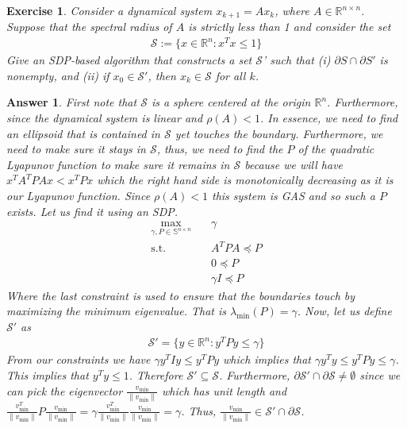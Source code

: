 \documentclass[12pt]{article}
\theoremstyle{colon}
\newtheorem{exercise}{Exercise}
\newtheorem*{answer}{Answer}
\begin{document}
\clearpage

\begin{exercise}
  Consider a dynamical system $x_{k+1} = A x_k$, where $A \in \mathbb{R}^{n \times n}$. Suppose that the spectral radius of $A$ is strictly less than 1 and consider the set
  \begin{gather*}
    \mathcal{S} := \{ x \in \mathbb{R}^n : x^T x \leq 1 \}
  \end{gather*}
  Give an SDP-based algorithm that constructs a set $\mathcal{S}$' such that (i) $\partial S \cap \partial S'$ is nonempty, and (ii) if $x_0 \in \mathcal{S}'$, then $x_k \in \mathcal{S}$ for all $k$.
\end{exercise}

\begin{answer}
  First note that $\mathcal{S}$ is a sphere centered at the origin $\mathbb{R}^n$. Furthermore, since the dynamical system is linear and $\rho(A) < 1$. In essence, we need to find an ellipsoid that is contained in $\mathcal{S}$ yet touches the boundary. Furthermore, we need to make sure it stays in $\mathcal{S}$, thus, we need to find the $P$ of the quadratic Lyapunov function to make sure it remains in $\mathcal{S}$ because we will have $x^T A^T P A x < x^T P x$ which the right hand side is monotonically decreasing as it is our Lyapunov function. Since $\rho(A) < 1$ this system is GAS and so such a $P$ exists. Let us find it using an SDP.
  \begin{align*}
    \max_{\gamma, P \in \mathbb{S}^{n \times n}} \quad &\gamma \\
    \text{s.t. } \quad & A^T P A \preceq P \\
    & 0 \preceq P \\
    & \gamma I \preceq P
  \end{align*}
  Where the last constraint is used to ensure that the boundaries touch by maximizing the minimum eigenvalue. That is $\lambda_{\min}(P) = \gamma$. Now, let us define $\mathcal{S}'$ as
  \begin{gather*}
    \mathcal{S}' = \{ y \in \mathbb{R}^n : y^T P y \leq  \gamma \}
  \end{gather*}
  From our constraints we have $\gamma y^T I y \leq y^T P y$ which implies that $\gamma y^T y \leq y^T P y \leq \gamma$. This implies that $y^T y \leq 1$. Therefore $\mathcal{S}' \subseteq \mathcal{S}$. Furthermore, $\partial \mathcal{S}' \cap \partial \mathcal{S} \neq \emptyset$ since we can pick the eigenvector $\frac{v_{\min}}{\lVert v_{\min} \rVert}$ which has unit length and $\frac{v_{\min}^T}{\lVert v_{\min} \rVert} P \frac{v_{\min}}{\lVert v_{\min} \rVert} = \gamma \frac{v_{\min}^T}{\lVert v_{\min} \rVert} \frac{v_{\min}}{\lVert v_{\min} \rVert} = \gamma$. Thus, $\frac{v_{\min}}{\lVert v_{\min} \rVert} \in \mathcal{S}' \cap \partial \mathcal{S}$.
\end{answer}
\end{document}
